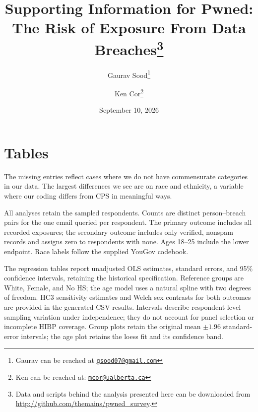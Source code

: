 \documentclass[12pt, letterpaper]{article}
\date{September 10, 2026}
\title{\Large{Supporting Information for Pwned:  The Risk of Exposure From Data Breaches}\footnote{Data and scripts behind the analysis presented here can be downloaded from \url{http://github.com/themains/pwned_survey}.
}}
\author{Gaurav Sood\thanks{Gaurav can be reached at \href{mailto:gsood07@gmail.com}{\footnotesize{\texttt{gsood07@gmail.com}}}} \and Ken Cor\thanks{Ken can be reached at: \href{mailto:mcor@ualberta.ca}{\footnotesize{\texttt{mcor@ualberta.ca}}}}\vspace{.5cm}}
\begin{document}
\maketitle

\begin{center}
\end{center}

\renewcommand{\thesection}{SI \arabic{section}}
\renewcommand\thetable{\thesection.\arabic{table}}
\renewcommand\thefigure{\thesection.\arabic{figure}}

\clearpage
\section{Tables}
\label{fig:si_tables}

The missing entries reflect cases where we do not have commensurate categories in our data. The largest differences we see are on race and ethnicity, a variable where our coding differs from CPS in meaningful ways.

All analyses retain the \sampleSize{} sampled respondents. Counts are distinct person--breach pairs for the one email queried per respondent. The primary outcome includes all recorded exposures; the secondary outcome includes only verified, nonspam records and assigns zero to respondents with none. Ages 18--25 include the lower endpoint. Race labels follow the supplied YouGov codebook.

The regression tables report unadjusted OLS estimates, standard errors, and 95\% confidence intervals, retaining the historical specification. Reference groups are White, Female, and No HS; the age model uses a natural spline with two degrees of freedom. HC3 sensitivity estimates and Welch sex contrasts for both outcomes are provided in the generated CSV results. Intervals describe respondent-level sampling variation under independence; they do not account for panel selection or incomplete HIBP coverage. Group plots retain the original mean $\pm 1.96$ standard-error intervals; the age plot retains the loess fit and its confidence band.
\end{document}
